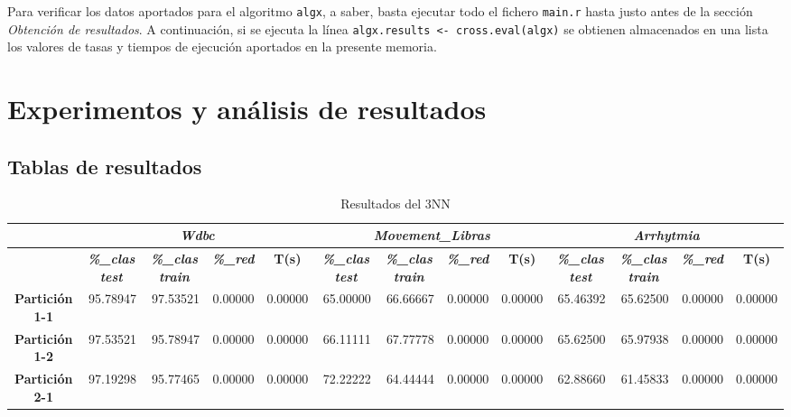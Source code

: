 \documentclass[a4paper,11pt]{article}
\begin{document}
 Para verificar los datos aportados para el algoritmo \texttt{algx}, a saber, basta ejecutar todo el fichero \texttt{main.r}
 hasta justo antes de la sección \textit{Obtención de resultados}. A continuación, si se ejecuta la línea 
 \texttt{algx.results <- cross.eval(algx)} se obtienen almacenados en una lista los valores de tasas y tiempos de ejecución
 aportados en la presente memoria.
 
 \section{Experimentos y análisis de resultados}
 \subsection{Tablas de resultados}
 \begin{table}[htbp]	
    \caption*{Resultados del 3NN}
    \begin{adjustbox}{width=1.1\textwidth}
    \begin{tabular}{|c|r|r|r|r|r|r|r|r|r|r|r|r|}
    \hline
    \multicolumn{1}{|l|}{} & \multicolumn{ 4}{c|}{\textbf{\textit{Wdbc}}} & \multicolumn{ 4}{c|}{\textbf{\textit{Movement\_Libras}}} & \multicolumn{ 4}{c|}{\textbf{\textit{Arrhytmia}}} \\ \hline
    & \multicolumn{1}{c|}{\textbf{\textit{\%\_clas test}}} & \multicolumn{1}{c|}{\textbf{\textit{\%\_clas train}}} & \multicolumn{1}{c|}{\textbf{\textit{\%\_red}}} & \multicolumn{1}{c|}{\textbf{T(s)}} & \multicolumn{1}{c|}{\textbf{\textit{\%\_clas test}}} & \multicolumn{1}{c|}{\textbf{\textit{\%\_clas train}}} & \multicolumn{1}{c|}{\textbf{\textit{\%\_red}}} & \multicolumn{1}{c|}{\textbf{T(s)}} & \multicolumn{1}{c|}{\textbf{\textit{\%\_clas test}}} & \multicolumn{1}{c|}{\textbf{\textit{\%\_clas train}}} & \multicolumn{1}{c|}{\textbf{\textit{\%\_red}}} & \multicolumn{1}{c|}{\textbf{T(s)}} \\ \hline
    \textbf{Partición 1-1} & 95.78947 & 97.53521 & 0.00000 & 0.00000 & 65.00000 & 66.66667 & 0.00000 & 0.00000 & 65.46392 & 65.62500 & 0.00000 & 0.00000 \\ \hline
    \textbf{Partición 1-2} & 97.53521 & 95.78947 & 0.00000 & 0.00000 & 66.11111 & 67.77778 & 0.00000 & 0.00000 & 65.62500 & 65.97938 & 0.00000 & 0.00000 \\ \hline
    \textbf{Partición 2-1} & 97.19298 & 95.77465 & 0.00000 & 0.00000 & 72.22222 & 64.44444 & 0.00000 & 0.00000 & 62.88660 & 61.45833 & 0.00000 & 0.00000 \\ \hline

\end{tabular}
\end{adjustbox}
\end{table}
\end{document}
